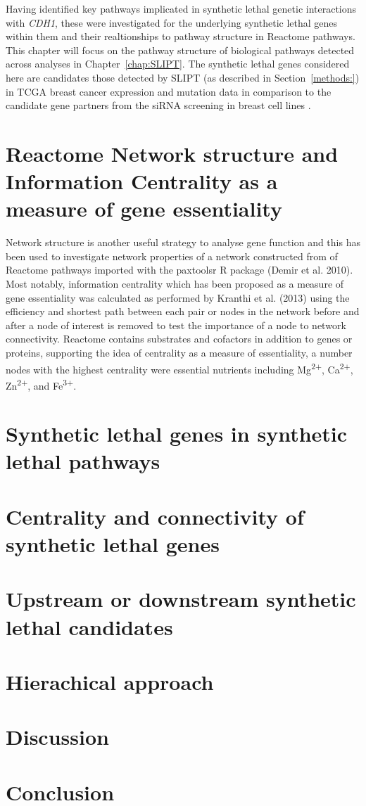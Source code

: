 Having identified key pathways implicated in synthetic lethal genetic interactions with \textit{CDH1}, these were investigated for the underlying synthetic lethal genes within them and their realtionships to pathway structure in Reactome pathways. This chapter will focus on the pathway structure of biological pathways detected across analyses in Chapter~\ref{chap:SLIPT}. The synthetic lethal genes considered here are candidates those detected by SLIPT (as described in Section~\ref{methods:}) in TCGA breast cancer expression and mutation data \citep{TCGA2012} in comparison to the candidate gene partners from the siRNA screening in breast cell lines \citep{Telford2015}. 



\section{Reactome Network structure and Information Centrality as a measure of gene essentiality}

Network structure is another useful strategy to analyse gene function and this has been used to investigate network properties of a network constructed from of Reactome pathways imported with the paxtoolsr R package (Demir et al. 2010). Most notably, information centrality which has been proposed as a measure of gene essentiality was calculated as performed by Kranthi et al. (2013) using the efficiency and shortest path between each pair or nodes in the network before and after a node of interest is removed to test the importance of a node to network connectivity. Reactome contains substrates and cofactors in addition to genes or proteins, supporting the idea of centrality as a measure of essentiality, a number nodes with the highest centrality were essential nutrients including Mg\textsuperscript{2$+$}, Ca\textsuperscript{2$+$}, Zn\textsuperscript{2$+$},  and Fe\textsuperscript{3$+$}.

\section{Synthetic lethal genes in synthetic lethal pathways}

\section{Centrality and connectivity of synthetic lethal genes}

\section{Upstream or downstream synthetic lethal candidates}

\section{Hierachical approach}

\section{Discussion}

\section{Conclusion}